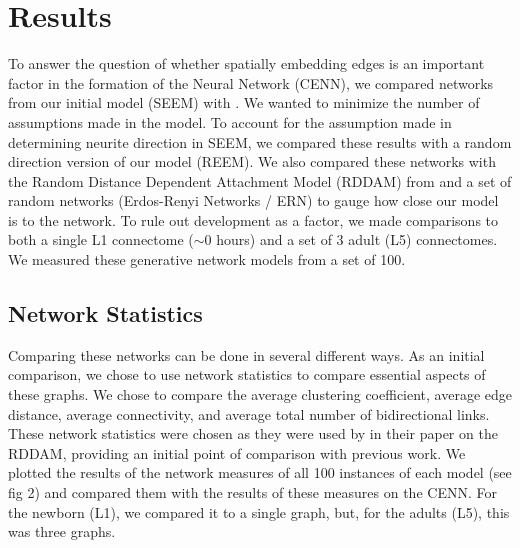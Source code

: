 \section{Results}


To answer the question of whether spatially embedding edges is an important factor in the formation of the \ce Neural Network (CENN), we compared networks from our initial model (SEEM) with \ce. 
We wanted to minimize the number of assumptions made in the model. 
To account for the assumption made in determining neurite direction in SEEM, we compared these results with a random direction version of our model (REEM). 
We also compared these networks with the Random Distance Dependent Attachment Model (RDDAM) from \cite{Itzhack} and a set of random networks (Erdos-Renyi Networks / ERN) to gauge how close our model is to the \ce network. 
To rule out development as a factor, we made comparisons to both a single L1 connectome ($\sim 0$ hours) and a set of 3 adult (L5) connectomes. 
We measured these generative network models from a set of 100.

\subsection{Network Statistics}
Comparing these networks can be done in several different ways. As an initial comparison, we chose to use network statistics to compare essential aspects of these graphs. We chose to compare the average clustering coefficient, average edge distance, average connectivity, and average total number of bidirectional links. These network statistics were chosen as they were used by \cite{Itzhack} in their paper on the RDDAM, providing an initial point of comparison with previous work. We plotted the results of the network measures of all 100 instances of each model (see fig 2) and compared them with the results of these measures on the CENN. For the newborn (L1), we compared it to a single graph, but, for the adults (L5), this was three graphs.

